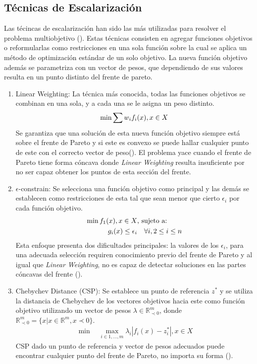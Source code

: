 \subsection{T\'ecnicas de Escalarizaci\'on }

Las t\'ecincas de escalarizaci\'on han sido las m\'as utilizadas para resolver el problema multiobjetivo (\cite{miettinen2012nonlinear}). Estas t\'ecnicas consisten en agregar funciones objetivos o  reformularlas como restricciones en una sola funci\'on sobre la cual se aplica un m\'etodo de optimizaci\'on est\'andar de un solo objetivo. La nueva funci\'on objetivo adem\'as se parametriza con un vector de pesos, que dependiendo de sus valores resulta en un punto distinto del frente de pareto.
\begin{enumerate}
    \item Linear Weighting: La t\'ecnica m\'as conocida, todas las funciones objetivos se combinan en una sola, y a cada una se le asigna un peso distinto.
    \begin{equation*}
        \min \sum w_i f_i(x), \space x \in X
    \end{equation*}
    Se garantiza que una soluci\'on de esta nueva funci\'on objetivo siempre est\'a sobre el frente de Pareto  y si este es convexo se puede hallar cualquier punto de este con el correcto vector de peso(\cite{emmerich2018tutorial}). El problema yace cuando el frente de Pareto tiene forma c\'oncava donde \textit{Linear Weighting} resulta insuficiente por no ser capaz obtener los puntos de esta secci\'on del frente.

    \item $\epsilon$-constrain: Se selecciona una funci\'on objetivo como principal y las dem\'as se establecen como restricciones de esta tal que sean menor que cierto $\epsilon_i$  por cada funci\'on objetivo.
    \begin{align*}
            \min  f_1(x), \space x \in X  & \text{, sujeto a:}   \\
            g_i(x) \leq \epsilon_i & \quad  \forall i, 2 \leq i \leq n
    \end{align*}
    Esta enfoque presenta dos dificultades principales: la valores de los $\epsilon_i$, para una adecuada selecci\'on requiren conocimiento previo del frente de Pareto y al igual que \textit{Linear Weighting}, no es capaz de detectar soluciones en las partes c\'oncavas del frente (\cite{emmerich2018tutorial}).

\item Chebychev Distance (CSP): Se establece un punto de referencia $z^*$ y se utiliza la distancia de Chebychev de los vectores objetivos hacia este como funci\'on objetivo utilizando un vector de pesos $\lambda \in \mathbb{R}^m_{\prec 0}$, donde $\mathbb{R}^m_{\prec 0} = \{x | x \in \mathbb{R}^m, x \prec 0 \}$. 
    \begin{align*}
        \min \quad \max_{i \in {1,...,m}} \lambda_i |f_i(x) - z^*_i|, x \in X 
    \end{align*}
    CSP dado un punto de referencia y vector de pesos adecuados puede encontrar cualquier punto del frente de Pareto, no importa su forma (\cite{emmerich2018tutorial}).
\end{enumerate}

